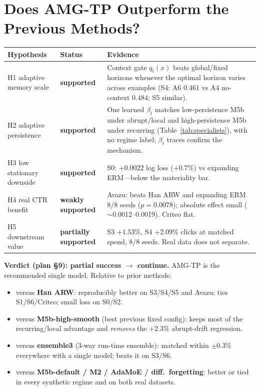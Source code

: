 \documentclass[11pt]{article}
\begin{document}
\section{Does AMG-TP Outperform the Previous Methods?}

\begin{table}[H]
\centering
\small
\begin{tabular}{@{}llp{8.4cm}@{}}
\toprule
Hypothesis & Status & Evidence \\
\midrule
H1 adaptive memory scale & \textbf{supported} & Context gate $q_t(x)$ beats global/fixed horizons whenever the optimal horizon varies across examples (S4: A6 $0.461$ vs A4 no-context $0.484$; S5 similar). \\
H2 adaptive persistence & \textbf{supported} & One learned $\beta_t$ matches low-persistence M5b under abrupt/local and high-persistence M5b under recurring (Table~\ref{tab:specialists}), with no regime label; $\beta_t$ traces confirm the mechanism. \\
H3 low stationary downside & \textbf{supported} & S0: $+0.0022$ log loss ($+0.7\%$) vs expanding ERM---below the materiality bar. \\
H4 real CTR benefit & \textbf{weakly supported} & Avazu: beats Han ARW and expanding ERM $8/8$ seeds ($p=0.0078$); absolute effect small ($\sim$0.0012--0.0019). Criteo flat. \\
H5 downstream value & \textbf{partially supported} & S3 $+1.53\%$, S4 $+2.09\%$ clicks at matched spend, $8/8$ seeds. Real data does not separate. \\
\bottomrule
\end{tabular}
\end{table}

\noindent\textbf{Verdict (plan \S9): partial success $\to$ continue.} AMG-TP is
the recommended single model. Relative to prior methods:
\begin{itemize}[nosep]
\item versus \textbf{Han ARW}: reproducibly better on S3/S4/S5 and Avazu; ties
S1/S6/Criteo; small loss on S0/S2.
\item versus \textbf{M5b-high-smooth} (best previous fixed config): keeps most of
the recurring/local advantage and \emph{removes} the $+2.3\%$ abrupt-drift
regression.
\item versus \textbf{ensemble3} (3-way run-time ensemble): matched within
$\pm0.3\%$ everywhere with a single model; beats it on S3/S6.
\item versus \textbf{M5b-default / M2 / AdaMoE / diff.\ forgetting}: better or
tied in every synthetic regime and on both real datasets.
\end{itemize}
\end{document}
